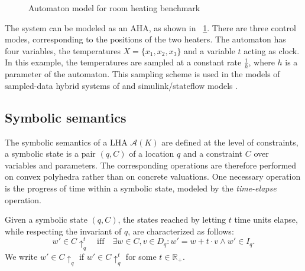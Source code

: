 \documentclass{llncs}
\newcommand{\A}{\ensuremath{\mathcal{A}}}
\newcommand{\Reals}{\ensuremath{\mathbb{R}}}
\newcommand{\telapse}{\ensuremath{\uparrow}}
\begin{document}
\begin{example}
\begin{figure}[tb]
  \caption{Automaton model for room heating benchmark}\label{fig:rhbaut}
\end{figure}
%
The system can be modeled as an AHA, as shown in
\figurename~\ref{fig:rhbaut}. There are three control modes, corresponding
to the positions of the two heaters. The automaton has four variables,
the temperatures $X = \{x_1, x_2, x_3\}$ and a variable $t$ acting as
clock. In this example, the temperatures are sampled at a constant
rate $\frac{1}{h}$, where $h$ is a parameter of the automaton.  This
sampling scheme is used in the models of sampled-data hybrid systems
of \cite{SK:2000} and simulink/stateflow models \cite{AKRS:2008}. 

\end{example}


\subsection{Symbolic semantics}
The symbolic semantics of a LHA $\A(K)$ are defined at the level of
constraints, a symbolic state is a pair $(q,C)$ of a location $q$ and
a constraint $C$ over variables and parameters. The corresponding
operations are therefore performed on convex polyhedra rather than on
concrete valuations. One necessary operation is the progress of time
within a symbolic state, modeled by the \emph{time-elapse} operation.

\begin{definition}\label{def:telapse}
Given a symbolic state $(q,C)$, the states reached by letting $t$ time
units elapse, while respecting the invariant of $q$, are characterized
as follows:
\begin{equation*}
 w' \in C \telapse_{q}^{t} \quad \text{iff} \quad \exists w \in C, v \in D_q: w' = w + t\cdot v \wedge w' \in I_q. 
\end{equation*}
We write  $w' \in C \telapse_{q} $ if $ w' \in C \telapse_{q}^{t}$
for some $t \in \Reals_+$.
\end{definition}
\end{document}

